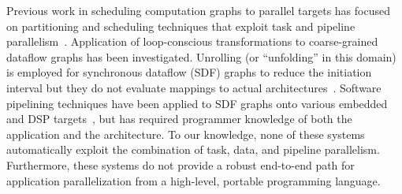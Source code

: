 
Previous work in scheduling computation graphs to parallel targets has
focused on partitioning and scheduling techniques that exploit task
and pipeline parallelism~\cite{SDFSched, SDFSched2,may87communicating,
DAGSched, pipeline-sdf}.  Application of loop-conscious
transformations to coarse-grained dataflow graphs has been
investigated.  Unrolling (or ``unfolding'' in this domain) is employed
for synchronous dataflow (SDF) graphs to reduce the initiation
interval but they do not evaluate mappings to actual
architectures~\cite{unfolding,unfolding2}. Software pipelining
techniques have been applied to SDF graphs onto various embedded and
DSP targets~\cite{bakshi99,chatha-02}, but has required programmer
knowledge of both the application and the architecture. To our
knowledge, none of these systems automatically exploit the combination
of task, data, and pipeline parallelism.  Furthermore, these systems
do not provide a robust end-to-end path for application
parallelization from a high-level, portable programming language.



